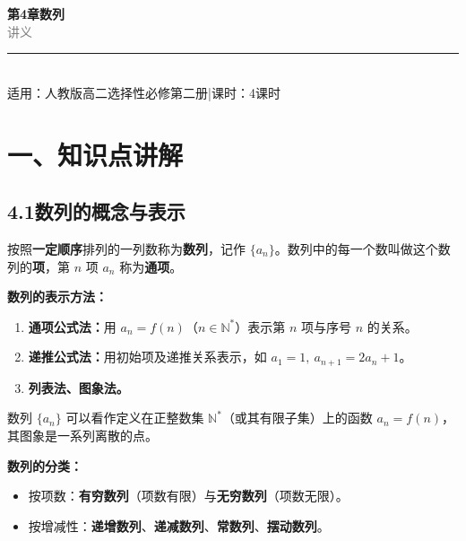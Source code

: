 \documentclass[12pt, a4paper]{ctexart}
\begin{document}
\begin{center}
{\Huge\bfseries\textcolor{mainblue}{第4章\quad 数列}}\\[12pt]
{\Large\textcolor{gray}{讲\quad 义}}\\[8pt]
\rule{0.6\textwidth}{1pt}\\[8pt]
{\normalsize 适用：人教版\quad 高二选择性必修第二册\quad |\quad 课时：4课时}
\end{center}
\vspace{10pt}

\section*{\textcolor{mainblue}{一、知识点讲解}}

\subsection*{4.1\quad 数列的概念与表示}

\begin{knowledgebox}[定义]
按照\textbf{一定顺序}排列的一列数称为\textbf{数列}，记作 $\{a_n\}$。数列中的每一个数叫做这个数列的\textbf{项}，第 $n$ 项 $a_n$ 称为\textbf{通项}。
\end{knowledgebox}

\medskip

\noindent\textbf{数列的表示方法：}
\begin{enumerate}[label=(\arabic*)]
  \item \textbf{通项公式法：}用 $a_n = f(n)$（$n \in \mathbb{N}^*$）表示第 $n$ 项与序号 $n$ 的关系。
  \item \textbf{递推公式法：}用初始项及递推关系表示，如 $a_1 = 1,\ a_{n+1} = 2a_n + 1$。
  \item \textbf{列表法、图象法。}
\end{enumerate}

\begin{tipbox}[数列与函数的关系]
数列 $\{a_n\}$ 可以看作定义在正整数集 $\mathbb{N}^*$（或其有限子集）上的函数 $a_n = f(n)$，其图象是一系列离散的点。
\end{tipbox}

\noindent\textbf{数列的分类：}
\begin{itemize}
  \item 按项数：\textbf{有穷数列}（项数有限）与\textbf{无穷数列}（项数无限）。
  \item 按增减性：\textbf{递增数列}、\textbf{递减数列}、\textbf{常数列}、\textbf{摆动数列}。
\end{itemize}
\end{document}
